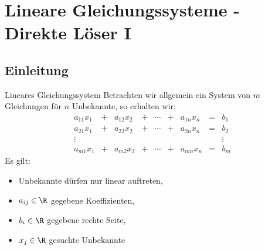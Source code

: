 \section{Lineare Gleichungssysteme - Direkte Löser I}

\subsection{Einleitung}

\begin{defi}{Lineares Gleichungssystem}
    Betrachten wir allgemein ein System von $m$ Gleichungen für $n$ Unbekannte, so erhalten wir:
    \[
        \begin{matrix}
            a_{11}x_1 & + & a_{12}x_2 & + & \cdots & + & a_{1n}x_n & = & b_1    \\
            a_{21}x_1 & + & a_{22}x_2 & + & \cdots & + & a_{2n}x_n & = & b_2    \\
            \vdots    &   &           &   &        &   &           &   & \vdots \\
            a_{m1}x_1 & + & a_{m2}x_2 & + & \cdots & + & a_{mn}x_n & = & b_m
        \end{matrix}
    \]
    Es gilt:
    \begin{itemize}
        \item Unbekannte dürfen nur linear auftreten,
        \item $a_{ij} \in \R$ gegebene Koeffizienten,
        \item $b_i \in \R$ gegebene rechte Seite,
        \item $x_j \in \R$ gesuchte Unbekannte
    \end{itemize}


\end{defi}
